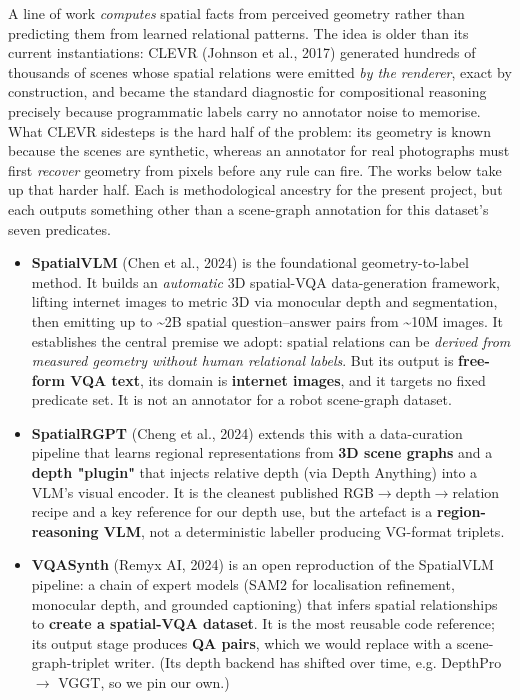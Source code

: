 A line of work \textit{computes} spatial facts from perceived geometry rather than predicting them from learned relational patterns. The idea is older than its current instantiations: CLEVR (Johnson et al., 2017) generated hundreds of thousands of scenes whose spatial relations were emitted \textit{by the renderer}, exact by construction, and became the standard diagnostic for compositional reasoning precisely because programmatic labels carry no annotator noise to memorise. What CLEVR sidesteps is the hard half of the problem: its geometry is known because the scenes are synthetic, whereas an annotator for real photographs must first \textit{recover} geometry from pixels before any rule can fire. The works below take up that harder half. Each is methodological ancestry for the present project, but each outputs something other than a scene-graph annotation for this dataset's seven predicates.

\begin{itemize}
\item \textbf{SpatialVLM} (Chen et al., 2024) is the foundational geometry-to-label
method. It builds an \textit{automatic} 3D spatial-VQA data-generation framework, lifting internet images to metric 3D via monocular depth and segmentation, then emitting up to \textasciitilde{}2B spatial question--answer pairs from \textasciitilde{}10M images. It establishes the central premise we adopt: spatial relations can be \textit{derived from measured geometry without human relational labels}. But its output is \textbf{free-form VQA text}, its domain is \textbf{internet images}, and it targets no fixed predicate set. It is not an annotator for a robot scene-graph dataset.
\end{itemize}

\begin{itemize}
\item \textbf{SpatialRGPT} (Cheng et al., 2024) extends this with a data-curation
pipeline that learns regional representations from \textbf{3D scene graphs} and a \textbf{depth "plugin"} that injects relative depth (via Depth Anything) into a VLM's visual encoder. It is the cleanest published RGB$\rightarrow$depth$\rightarrow$relation recipe and a key reference for our depth use, but the artefact is a \textbf{region-reasoning VLM}, not a deterministic labeller producing VG-format triplets.
\end{itemize}

\begin{itemize}
\item \textbf{VQASynth} (Remyx AI, 2024) is an open reproduction of the SpatialVLM
pipeline: a chain of expert models (SAM2 for localisation refinement, monocular depth, and grounded captioning) that infers spatial relationships to \textbf{create a spatial-VQA dataset}. It is the most reusable code reference; its output stage produces \textbf{QA pairs}, which we would replace with a scene-graph-triplet writer. (Its depth backend has shifted over time, e.g. DepthPro $\rightarrow$ VGGT, so we pin our own.)
\end{itemize}

